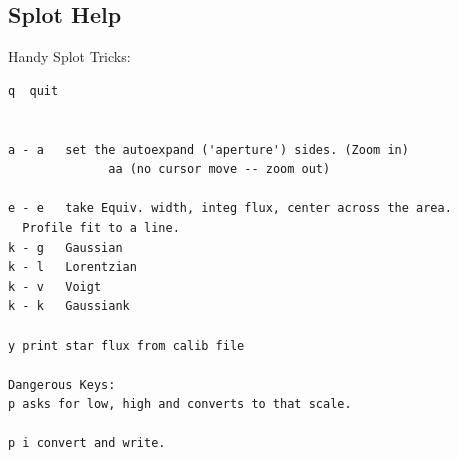 \renewcommand{\footerfilename}{SPLOTQuestion.tex}

\subsection{Splot Help}
Handy Splot Tricks:


\begingroup \fontsize{10pt}{10pt}
\selectfont
\begin{verbatim} 
q  quit


a - a   set the autoexpand ('aperture') sides. (Zoom in)
              aa (no cursor move -- zoom out)

e - e   take Equiv. width, integ flux, center across the area.
  Profile fit to a line.
k - g   Gaussian
k - l   Lorentzian
k - v   Voigt
k - k   Gaussiank

y print star flux from calib file

Dangerous Keys:
p asks for low, high and converts to that scale.

p i convert and write.

\end{verbatim}
\endgroup

